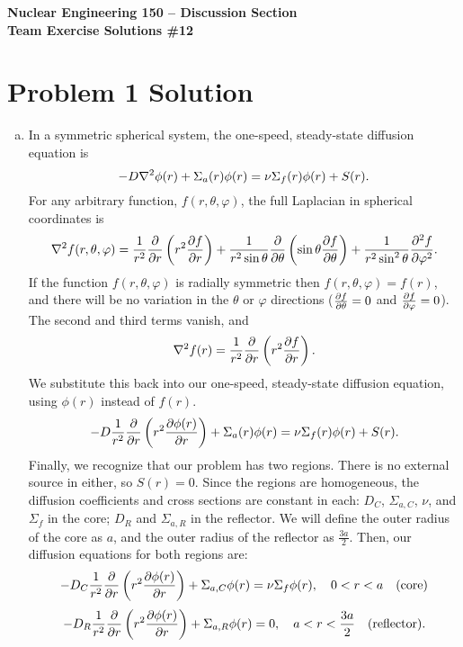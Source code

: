 \documentclass{report}
\begin{document}
\begin{center}
\textbf{\large Nuclear Engineering 150 -- Discussion Section}\\ 
\textbf{Team Exercise Solutions \#12}
\end{center}



\section*{Problem 1 Solution}


\begin{enumerate}[a)]

\item

 In a symmetric spherical system, the one-speed, steady-state diffusion equation is
$$ -D \nabla^2 \phi(r) + \Sigma_a (r) \phi(r) = \nu \Sigma_f(r) \phi(r) + S(r) .$$
For any arbitrary function, $f(r,\theta,\varphi)$, the full Laplacian in spherical coordinates is
$$ \nabla^2 f(r,\theta,\varphi) = \frac{1}{r^2}\frac{\partial}{\partial r}\left(r^2 \frac{\partial f}{\partial r}\right) +  \frac{1}{r^2 \sin\theta} \frac{\partial}{\partial \theta}\left(\sin\theta \frac{\partial f}{\partial \theta}\right) + \frac{1}{r^2 \sin^2 \theta} \frac{\partial^2 f}{\partial \varphi^2} .$$
If the function $f(r,\theta,\varphi)$ is radially symmetric then $f(r,\theta,\varphi) = f(r)$, and there will be no variation in the $\theta$ or $\varphi$ directions ($\frac{\partial f}{\partial \theta} = 0$ and $\frac{\partial f}{\partial \varphi} = 0$).  The second and third terms vanish, and
$$ \nabla^2 f(r) = \frac{1}{r^2}\frac{\partial}{\partial r}\left(r^2 \frac{\partial f}{\partial r}\right) .$$
We substitute this back into our one-speed, steady-state diffusion equation, using $\phi(r)$ instead of $f(r)$.
$$ -D \frac{1}{r^2}\frac{\partial}{\partial r}\left(r^2 \frac{\partial \phi(r)}{\partial r}\right) + \Sigma_a (r) \phi(r) = \nu \Sigma_f(r) \phi(r) + S(r) .$$
Finally, we recognize that our problem has two regions. There is no external source in either, so $S(r) = 0$. Since the regions are homogeneous, the diffusion coefficients and cross sections are constant in each: $D_C$, $\Sigma_{a,C}$, $\nu$, and $\Sigma_f$ in the core; $D_R$ and $\Sigma_{a,R}$ in the reflector. We will define the outer radius of the core as $a$, and the outer radius of the reflector as $\frac{3a}{2}$. Then, our diffusion equations for both regions are:
$$ -D_C \frac{1}{r^2}\frac{\partial}{\partial r}\left(r^2 \frac{\partial \phi(r)}{\partial r}\right) + \Sigma_{a,C} \phi(r) = \nu \Sigma_f \phi(r), \quad 0 < r < a \quad\text{(core)} $$
$$ -D_R \frac{1}{r^2}\frac{\partial}{\partial r}\left(r^2 \frac{\partial \phi(r)}{\partial r}\right) + \Sigma_{a,R}\phi(r) = 0, \quad a < r < \frac{3a}{2} \quad\text{(reflector)}.$$

\end{enumerate}
\end{document}
